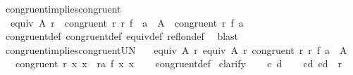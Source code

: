 \begin{isabellebody}
\isanewline
\isanewline
{}\isamarkupfalse%
\ congruent{}{\isacharunderscore}{\kern0pt}implies{\isacharunderscore}{\kern0pt}congruent{\isacharcolon}{\kern0pt}\isanewline
\ \ {\isachardoublequoteopen}equiv\ A\ r{}\ {\isasymLongrightarrow}\ congruent{}\ r{}\ r{}\ f\ {\isasymLongrightarrow}\ a\ {\isasymin}\ A\ {\isasymLongrightarrow}\ congruent\ r{}\ {\isacharparenleft}{\kern0pt}f\ a{\isacharparenright}{\kern0pt}{\isachardoublequoteclose}\isanewline
%
\isadelimproof
\ \ %
\endisadelimproof
%
\isatagproof
{}\isamarkupfalse%
\ congruent{\isacharunderscore}{\kern0pt}def\ congruent{}{\isacharunderscore}{\kern0pt}def\ equiv{\isacharunderscore}{\kern0pt}def\ refl{\isacharunderscore}{\kern0pt}on{\isacharunderscore}{\kern0pt}def\ \isamarkupfalse%
\ blast%
\endisatagproof
{\isafoldproof}%
%
\isadelimproof
\isanewline
%
\endisadelimproof
\isanewline
{}\isamarkupfalse%
\ congruent{}{\isacharunderscore}{\kern0pt}implies{\isacharunderscore}{\kern0pt}congruent{\isacharunderscore}{\kern0pt}UN{\isacharcolon}{\kern0pt}\isanewline
\ \ \ {\isachardoublequoteopen}equiv\ A{}\ r{}{\isachardoublequoteclose}\ {\isachardoublequoteopen}equiv\ A{}\ r{}{\isachardoublequoteclose}\ {\isachardoublequoteopen}congruent{}\ r{}\ r{}\ f{\isachardoublequoteclose}\ {\isachardoublequoteopen}a\ {\isasymin}\ A{}{\isachardoublequoteclose}\ \isanewline
\ \ \ {\isachardoublequoteopen}congruent\ r{}\ {\isacharparenleft}{\kern0pt}{\isasymlambda}x{}{\isachardot}{\kern0pt}\ {\isasymUnion}x{}\ {\isasymin}\ r{}{\isacharbackquote}{\kern0pt}{\isacharbackquote}{\kern0pt}{\isacharbraceleft}{\kern0pt}a{\isacharbraceright}{\kern0pt}{\isachardot}{\kern0pt}\ f\ x{}\ x{}{\isacharparenright}{\kern0pt}{\isachardoublequoteclose}\isanewline
%
\isadelimproof
\ \ %
\endisadelimproof
%
\isatagproof
{}\isamarkupfalse%
\ congruent{\isacharunderscore}{\kern0pt}def\isanewline
{}\isamarkupfalse%
\ clarify\isanewline
\ \ \isamarkupfalse%
\ c\ d\isanewline
\ \ \isamarkupfalse%
\ cd{\isacharcolon}{\kern0pt}\ {\isachardoublequoteopen}{\isacharparenleft}{\kern0pt}c{\isacharcomma}{\kern0pt}d{\isacharparenright}{\kern0pt}\ {\isasymin}\ r{}{\isachardoublequoteclose}\isanewline
\ \ \isamarkupfalse%

\end{isabellebody}
